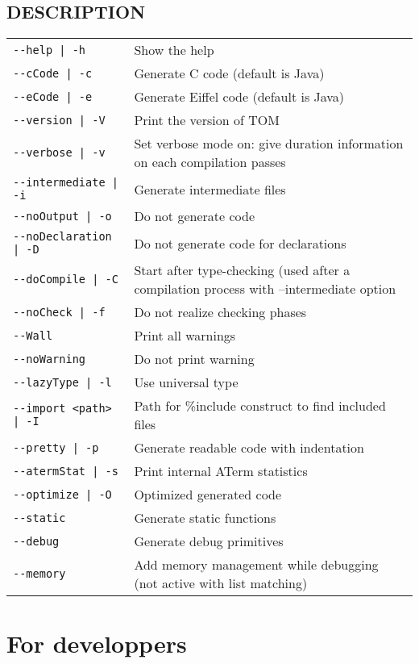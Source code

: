 \subsection{DESCRIPTION}
\begin{tabular}{|l|l|}
\hline
\verb#--help | -h#&            Show the help \\
\verb#--cCode | -c#&           Generate C code (default is Java)\\
\verb#--eCode | -e#&           Generate Eiffel code (default is Java)\\
\verb#--version | -V#&         Print the version of TOM\\
\verb#--verbose | -v#&         Set verbose mode on: give duration
                               information on each compilation passes\\
\verb#--intermediate | -i#&    Generate intermediate files \\
\verb#--noOutput | -o#&        Do not generate code \\
\verb#--noDeclaration | -D#&   Do not generate code for declarations \\
\verb#--doCompile | -C#&       Start after type-checking (used after a
                               compilation process with --intermediate option\\
\verb#--noCheck | -f#&         Do not realize checking phases \\
\verb#--Wall#&       Print all warnings \\
\verb#--noWarning#&       Do not print warning \\
\verb#--lazyType | -l#&        Use universal type \\
\verb#--import <path> | -I#&   Path for \%include construct to find included files\\
\verb#--pretty | -p#&          Generate readable code with indentation \\
\verb#--atermStat | -s#&       Print internal ATerm statistics \\
\verb#--optimize | -O#&        Optimized generated code \\
\verb#--static#&               Generate static functions \\
\verb#--debug#&                Generate debug primitives \\
\verb#--memory#&               Add memory management while debugging (not active with list matching)\\
\hline
\end{tabular}

\section{For developpers}\label{developpers}
